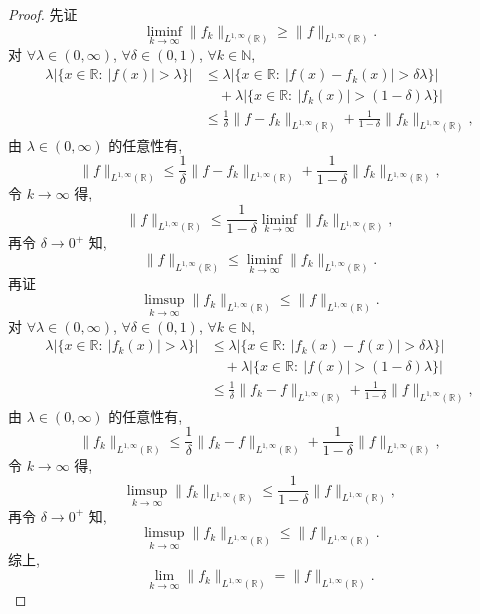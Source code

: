\documentclass[a4paper,11pt]{article}
\theoremstyle{definition}
\begin{document}
\begin{proof}
    先证
    $$
        \liminf_{k \to \infty} \| f_k \|_{L^{1, \infty}(\mathbb{R})}
            \geq \| f \|_{L^{1, \infty}(\mathbb{R})}.
    $$
    对 $ \forall \lambda \in (0, \infty) $, $ \forall \delta \in (0, 1) $, $ \forall k \in \mathbb{N} $,
    \begin{align*}
        \lambda |\{ x \in \mathbb{R} :\ |f(x)| > \lambda \}|
            &\leq \lambda |\{ x \in \mathbb{R} :\ |f(x) - f_k(x)| > \delta\lambda \}| \\
                &\quad + \lambda |\{ x \in \mathbb{R} :\ |f_k(x)| > (1 - \delta)\lambda \}| \\
            &\leq \frac{1}{\delta} \| f - f_k \|_{L^{1, \infty}(\mathbb{R})}
                + \frac{1}{1 - \delta} \| f_k \|_{L^{1, \infty}(\mathbb{R})},
    \end{align*}
    由 $ \lambda \in (0, \infty) $ 的任意性有,
    $$
        \| f \|_{L^{1, \infty}(\mathbb{R})}
            \leq \frac{1}{\delta} \| f - f_k \|_{L^{1, \infty}(\mathbb{R})}
                + \frac{1}{1 - \delta} \| f_k \|_{L^{1, \infty}(\mathbb{R})},
    $$
    令 $ k \to \infty $ 得,
    $$
        \| f \|_{L^{1, \infty}(\mathbb{R})}
            \leq \frac{1}{1 - \delta} \liminf_{k \to \infty} \| f_k \|_{L^{1, \infty}(\mathbb{R})},
    $$
    再令 $ \delta \to 0^+ $ 知,
    $$
        \| f \|_{L^{1, \infty}(\mathbb{R})}
            \leq \liminf_{k \to \infty} \| f_k \|_{L^{1, \infty}(\mathbb{R})}.
    $$
    再证
    $$
        \limsup_{k \to \infty} \| f_k \|_{L^{1, \infty}(\mathbb{R})}
            \leq \| f \|_{L^{1, \infty}(\mathbb{R})}.
    $$
    对 $ \forall \lambda \in (0, \infty) $, $ \forall \delta \in (0, 1) $, $ \forall k \in \mathbb{N} $,
    \begin{align*}
        \lambda |\{ x \in \mathbb{R} :\ |f_k(x)| > \lambda \}|
            &\leq \lambda |\{ x \in \mathbb{R} :\ |f_k(x) - f(x)| > \delta\lambda \}| \\
                &\quad + \lambda |\{ x \in \mathbb{R} :\ |f(x)| > (1 - \delta)\lambda \}| \\
            &\leq \frac{1}{\delta} \| f_k - f \|_{L^{1, \infty}(\mathbb{R})}
                + \frac{1}{1 - \delta} \| f \|_{L^{1, \infty}(\mathbb{R})},
    \end{align*}
    由 $ \lambda \in (0, \infty) $ 的任意性有,
    $$
        \| f_k \|_{L^{1, \infty}(\mathbb{R})}
            \leq \frac{1}{\delta} \| f_k - f \|_{L^{1, \infty}(\mathbb{R})}
                + \frac{1}{1 - \delta} \| f \|_{L^{1, \infty}(\mathbb{R})},
    $$
    令 $ k \to \infty $ 得,
    $$
        \limsup_{k \to \infty} \| f_k \|_{L^{1, \infty}(\mathbb{R})}
            \leq \frac{1}{1 - \delta} \| f \|_{L^{1, \infty}(\mathbb{R})},
    $$
    再令 $ \delta \to 0^+ $ 知,
    $$
        \limsup_{k \to \infty} \| f_k \|_{L^{1, \infty}(\mathbb{R})}
            \leq \| f \|_{L^{1, \infty}(\mathbb{R})}.
    $$
    综上,
    $$
        \lim_{k \to \infty} \| f_k \|_{L^{1, \infty}(\mathbb{R})}
            = \| f \|_{L^{1, \infty}(\mathbb{R})}.
    $$
\end{proof}
\end{document}
